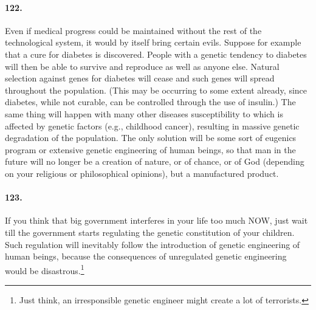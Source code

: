 \documentclass[12pt]{book}
\begin{document}
\paragraph{122.} Even if medical progress could be maintained without the rest of the technological system, it would by itself bring certain evils. Suppose for example that a cure for diabetes is discovered. People with a genetic tendency to diabetes will then be able to survive and reproduce as well as anyone else.  Natural selection against genes for diabetes will cease and such genes will spread throughout the population. (This may be occurring to some extent already, since diabetes, while not curable, can be controlled through the use of insulin.) The same thing will happen with many other diseases susceptibility to which is affected by genetic factors (e.g., childhood cancer), resulting in massive genetic degradation of the population. The only solution will be some sort of eugenics program or extensive genetic engineering of human beings, so that man in the future will no longer be a creation of nature, or of chance, or of God (depending on your religious or philosophical opinions), but a manufactured product.


\paragraph{123.}  If you think that big government interferes in your life too much NOW, just wait till the government starts regulating the genetic constitution of your children. Such regulation will inevitably follow the introduction of genetic engineering of human beings, because the consequences of unregulated genetic engineering would be disastrous.\footnote{Just think, an irresponsible genetic engineer might create a lot of terrorists.}
\end{document}
